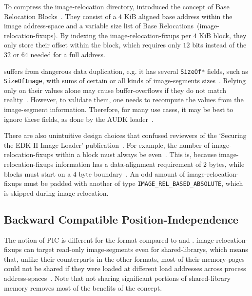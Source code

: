 To compress the \gls{image-relocation} directory,  introduced the concept of Base Relocation Blocks~\cite{pe-format}. They consist of a $4$ KiB aligned base address within the \gls{image} \gls{address-space} and a variable size list of Base Relocations~(\glspl{image-relocation-fixup}). By indexing the \glspl{image-relocation-fixup} per $4$ KiB block, they only store their offset within the block, which requires only $12$ bits instead of the $32$ or $64$ needed for a full address.

 suffers from dangerous data duplication, e.g. it has several \lstinline|SizeOf*| fields, such as \lstinline|SizeOfImage|, with sums of certain or all  kinds of \glspl{image-segment} sizes~\cite{pe-format}. Relying only on their values alone may cause \glspl{buffer-overflow} if they do not match reality~\cite{secure-pe}. However, to validate them, one needs to recompute the values from the \gls{image-segment} information. Therefore, for many use cases, it may be best to ignore these fields, as done by the \gls{AUDK}  loader~\cite{audk}.

There are also unintuitive design choices that confused reviewers of the `Securing the EDK II Image Loader' publication~\cite{secure-pe}. For example, the number of \glspl{image-relocation-fixup} within a block must always be even~\cite{secure-pe}. This is, because \glspl{image-relocation-fixup} information has a \gls{data-alignment} requirement of $2$ \glspl{byte}, while blocks must start on a $4$ \gls{byte} boundary~\cite{pe-format}. An odd amount of \glspl{image-relocation-fixup} must be padded with another of type \lstinline|IMAGE_REL_BASED_ABSOLUTE|, which is skipped during \gls{image-relocation}.

\subsection{Backward Compatible Position-Independence}

The notion of \gls{PIC} is different for the  format compared to  and . \Glspl{image-relocation-fixup} can target read-only \glspl{image-segment} even for  \glspl{shared-library}, which means that, unlike their counterparts in the other formats, most of their \glspl{memory-page} could not be shared if they were loaded at different load addresses across process \glspl{address-space}~\cite{ms-aslr}. Note that not sharing significant portions of \gls{shared-library} memory removes most of the benefits of the concept.

